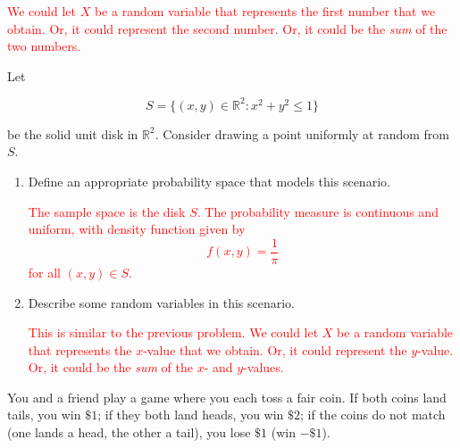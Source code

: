 \documentclass[12pt,reqno]{amsart}
\begin{document}
\bigskip
\textcolor{red}{We could let $X$ be a random variable that represents the first number that we obtain. Or, it could represent the second number. Or, it could be the \textit{sum} of the two numbers.}
\bigskip























\bigskip
\prob Let

	\[
	S = \{ (x,y) \in \mathbb{R}^2 : x^2+y^2 \leq 1\}
	\]

be the solid unit disk in $\mathbb{R}^2$. Consider drawing a point uniformly at random from $S$.

\medskip
\begin{enumerate}
\item Define an appropriate probability space that models this scenario.

\bigskip
\textcolor{red}{The sample space is the disk $S$. The probability measure is continuous and uniform, with density function given by
	\[
	f(x,y) = \frac{1}{\pi}
	\]
for all $(x,y)\in S$.}
\bigskip

\item Describe some random variables in this scenario.

\bigskip
\textcolor{red}{This is similar to the previous problem. We could let $X$ be a random variable that represents the $x$-value that we obtain. Or, it could represent the $y$-value. Or, it could be the \textit{sum} of the $x$- and $y$-values.}
\bigskip
\end{enumerate}

























\bigskip
\prob You and a friend play a game where you each toss a fair coin. If both coins land tails, you win $\$1$; if they both land heads, you win $\$2$; if the coins do not match (one lands a head, the other a tail), you lose $\$1$ (win $-\$1$).
\end{document}
